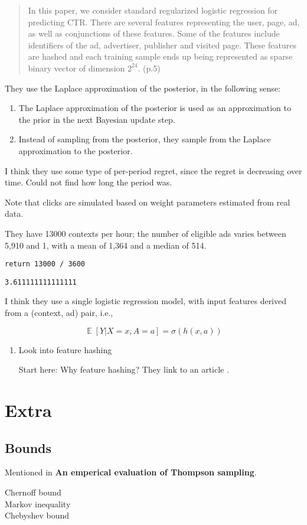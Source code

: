 \documentclass[11pt]{article}
\newcommand{\E}[1]{\operatorname{\mathbb{E}}[#1]}
\begin{document}
\begin{quote}
In this paper, we consider standard regularized logistic regression for
predicting CTR. There are several features representing the user, page, ad, as
well as conjunctions of these features. Some of the features include identifiers
of the ad, advertiser, publisher and visited page. These features are
hashed and each training sample ends up being represented as sparse binary
vector of dimension $2^{24}$. (p.5)
\end{quote}

They use the Laplace approximation of the posterior, in the following sense:
\begin{enumerate}
\item The Laplace approximation of the posterior is used as an approximation to the
prior in the next Bayesian update step.
\item Instead of sampling from the posterior, they sample from the Laplace
approximation to the posterior.
\end{enumerate}

I think they use some type of per-period regret, since the regret is decreasing
over time. Could not find how long the period was.

Note that clicks are simulated based on weight parameters estimated from real
data.

They have 13000 contexts per hour; the number of eligible ads varies between
5,910 and 1, with a mean of 1,364 and a median of 514.

\begin{verbatim}
return 13000 / 3600
\end{verbatim}

\begin{verbatim}
3.611111111111111
\end{verbatim}

I think they use a single logistic regression model, with input features derived
from a (context, ad) pair, i.e.,

\[
\E{Y|X=x, A=a} = \sigma(h(x, a))
\]







\begin{enumerate}
\item Look into feature hashing
\label{sec-2-1-4-1}

Start here: Why feature hashing? They link to an article \footnotemark[1]{}.
\end{enumerate}


\section{Extra}
\label{sec-3}

\subsection{Bounds}
\label{sec-3-1}
Mentioned in \textbf{An emperical evaluation of Thompson sampling}.

\begin{description}
\item[{Chernoff bound}] 
\item[{Markov inequality}] 
\item[{Chebyshev bound}] 
\end{description}
\end{document}
